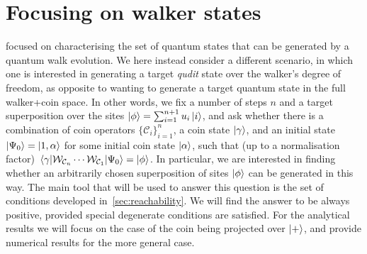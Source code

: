 \section{Focusing on walker states}
\label{sec:focusing_walker_states}
 focused on characterising the set of quantum states that can be generated by a quantum walk evolution.
We here instead consider a different scenario, in which one is interested in generating a target \emph{qudit} state over the walker's degree of freedom, as opposite to wanting to generate a target quantum state in the full walker+coin space.
In other words, we fix a number of steps $n$ and a target superposition over the sites $\ket\phi=\sum_{i=1}^{n+1} u_i\ket i$, and ask whether there is a combination of coin operators $\{\mathcal C_i\}_{i=1}^{n}$, a coin state $\ket\gamma$, and an initial state $\ket{\Psi_0}=\ket{1, \alpha}$ for some initial coin state $\ket\alpha$, such that (up to a normalisation factor)
$\mel{\gamma}{\mathcal W_{\mathcal C_{n}} \cdots\mathcal W_{\mathcal C_{1}}}{\Psi_0} = \ket\phi$.
In particular, we are interested in finding whether an arbitrarily chosen superposition of sites $\ket\phi$ can be generated in this way.
The main tool that will be used to answer this question is the set of conditions developed in~\cref{sec:reachability}.
We will find the answer to be always positive, provided special degenerate conditions are satisfied.
For the analytical results we will focus on the case of the coin being projected over $\ket+$,
and provide numerical results for the more general case.

